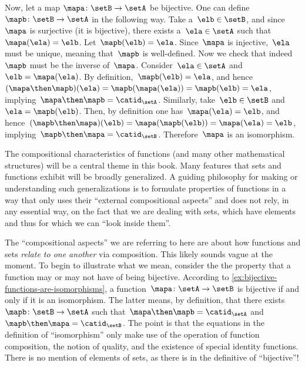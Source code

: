 \begin{solution}
    Now, let a map $\mapa\colon \setB \to \setA$ be bijective.
    One can define~$\mapb\colon \setB\to \setA$ in the following way.
    Take a~$\elb\in \setB$, and since~$\mapa$ is surjective (it is bijective), there exists a~$\ela\in \setA$ such that~$\mapa(\ela)=\elb$.
    Let~$\mapb(\elb)=\ela$.
    Since~$\mapa$ is injective,~$\ela$ must be unique, meaning that~$\mapb$ is well-defined.
    Now we check that indeed~$\mapb$ must be the inverse of~$\mapa$.
    Consider~$\ela \in \setA$ and~$\elb=\mapa(\ela)$.
    By definition,~$\mapb(\elb)=\ela$, and hence~$(\mapa\then \mapb)(\ela)=\mapb(\mapa(\ela))=\mapb(\elb)=\ela$, implying~$\mapa\then \mapb=\catid_\setA$.
    Similarly, take~$\elb\in \setB$ and~$\ela=\mapb(\elb)$.
    Then, by definition one has~$\mapa(\ela)=\elb$, and hence~$(\mapb\then \mapa)(\elb)=\mapa(\mapb(\elb))=\mapa(\ela)=\elb$, implying~$\mapb\then \mapa=\catid_\setB$.
    Therefore~$\mapa$ is an isomorphism.



\end{solution}

The compositional characteristics of functions (and many other mathematical structures) will be a central theme in this book.
Many features that sets and functions exhibit will be broadly generalized.
A guiding philosophy for making or understanding such generalizations is to formulate properties of functions in a way that only uses their ``external compositional aspects'' and does not rely, in any essential way, on the fact that we are dealing with sets, which have elements and thus for which we can ``look inside them''.

The ``compositional aspects'' we are referring to here are about how functions and sets \emph{relate to one another} via composition.
This likely sounds vague at the moment.
To begin to illustrate what we mean, consider the the property that a function may or may not have of being bijective.
According to \cref{ex:bijective-functions-are-isomorphisms}, a function~$\mapa\colon \setA \to \setB$ is bijective if and only if it is an isomorphism.
The latter means, by definition, that there exists~$\mapb \colon \setB \to \setA$ such that~$\mapa \then \mapb = \catid_\setA$ and~$\mapb \then \mapa = \catid_\setB$.
The point is that the equations in the definition of ``isomorphism'' only make use of the operation of function composition, the notion of quality, and the existence of special identity functions.
There is no mention of elements of sets, as there is in the definitive of ``bijective''!

